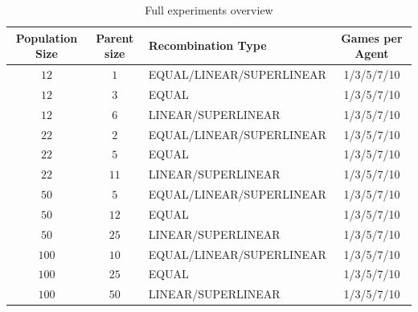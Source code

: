 \begin{table}[H]
\centering
\begin{tabular}{c c l c}
Population Size & Parent size & Recombination Type & Games per Agent\\
\hline
$12$ & $1$ & EQUAL/LINEAR/SUPERLINEAR & 1/3/5/7/10\\
$12$ & $3$ & EQUAL & 1/3/5/7/10\\
$12$ & $6$ & LINEAR/SUPERLINEAR & 1/3/5/7/10\\
$22$ & $2$ & EQUAL/LINEAR/SUPERLINEAR & 1/3/5/7/10\\
$22$ & $5$ & EQUAL & 1/3/5/7/10\\
$22$ & $11$ & LINEAR/SUPERLINEAR & 1/3/5/7/10\\
$50$ & $5$ & EQUAL/LINEAR/SUPERLINEAR & 1/3/5/7/10\\
$50$ & $12$ & EQUAL & 1/3/5/7/10\\
$50$ & $25$ & LINEAR/SUPERLINEAR & 1/3/5/7/10\\
$100$ & $10$ & EQUAL/LINEAR/SUPERLINEAR & 1/3/5/7/10\\
$100$ & $25$ & EQUAL & 1/3/5/7/10\\
$100$ & $50$ & LINEAR/SUPERLINEAR & 1/3/5/7/10
\end{tabular}
\caption{Full experiments overview \label{SuperCMAExperimentAppendix}}
\end{table}




\clearpage

